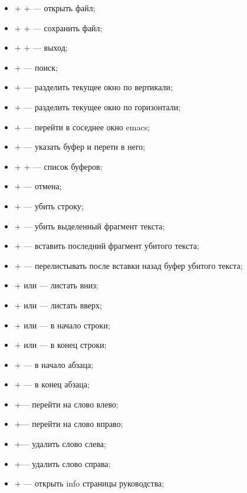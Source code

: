 \begin{itemize}
  \item \Ctrl$+$ \Ctrl$+$  --- открыть файл;
  \item \Ctrl$+$ \Ctrl$+$  --- сохранить файл;
  \item \Ctrl$+$ \Ctrl$+$  --- выход;
  \item \Ctrl$+$           --- поиск;
  \item \Ctrl$+$   --- разделить текущее окно по вертикали;
  \item \Ctrl$+$   --- разделить текущее окно по горизонтали;
  \item \Ctrl$+$   --- перейти в соседнее окно emacs;
  \item \Ctrl$+$   --- указать буфер и перети в него;
  \item \Ctrl$+$ \Ctrl$+$  --- список буферов;
  \item \Ctrl$+$   --- отмена;
  \item \Ctrl$+$  --- убить строку;
  \item \Ctrl$+$  --- убить выделенный фрагмент текста;
  \item \Ctrl$+$  --- вставить последний фрагмент убитого текста;
  \item \Alt$+$   --- перелистывать после вставки назад буфер убитого текста;
  \item \Ctrl$+$ или \PgDown  --- листать вниз;
  \item \Alt$+$  или \PgUp    --- листать вверх;
  \item \Ctrl$+$ или \Home  --- в начало строки;
  \item \Ctrl$+$ или \End   --- в конец строки;
  \item \Alt$+$  --- в начало абзаца;
  \item \Alt$+$  --- в конец абзаца;
  \item \Ctrl$+$\LArrow  --- перейти на слово влево;
  \item \Ctrl$+$\RArrow  --- перейти на слово вправо;
  \item \Ctrl$+$\BSpace  --- удалить слово слева;
  \item \Ctrl$+$\Del     --- удалить слово справа;
  \item \Ctrl$+$   --- открыть info страницы руководства;
\end{itemize}

